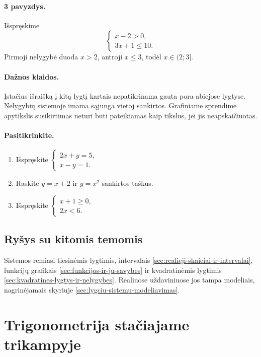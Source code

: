 \paragraph{3 pavyzdys.}
Išspręskime
\[
\begin{cases}
x-2>0,\\
3x+1\le10.
\end{cases}
\]
Pirmoji nelygybė duoda $x>2$, antroji $x\le3$, todėl $x\in(2;3]$.

\paragraph{Dažnos klaidos.}
Įstačius išraišką į kitą lygtį kartais nepatikrinama gauta pora abiejose lygtyse. Nelygybių sistemoje imama sąjunga vietoj sankirtos. Grafiniame sprendime apytikslis susikirtimas neturi būti pateikiamas kaip tikslus, jei jis neapskaičiuotas.

\paragraph{Pasitikrinkite.}
\begin{enumerate}
\item Išspręskite $\begin{cases}2x+y=5,\\ x-y=1.\end{cases}$
\item Raskite $y=x+2$ ir $y=x^2$ sankirtos taškus.
\item Išspręskite $\begin{cases}x+1\ge0,\\ 2x<6.\end{cases}$
\end{enumerate}

\subsection{Ryšys su kitomis temomis}

Sistemos remiasi tiesinėmis lygtimis, intervalais \ref{sec:realieji-skaiciai-ir-intervalai}, funkcijų grafikais \ref{sec:funkcijos-ir-ju-savybes} ir kvadratinėmis lygtimis \ref{sec:kvadratines-lygtys-ir-nelygybes}. Realiuose uždaviniuose jos tampa modeliais, nagrinėjamais skyriuje \ref{sec:lygciu-sistemu-modeliavimas}.

\section{Trigonometrija stačiajame trikampyje}\label{sec:trigonometrija-staciajame-trikampyje}

